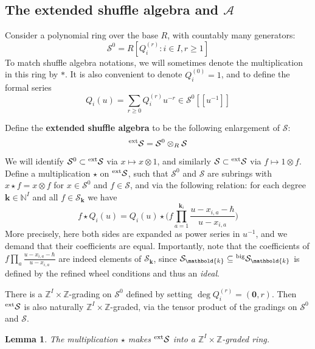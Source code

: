 \documentclass[11pt,reqno]{amsart}
\renewcommand{\mathbf}{\mathbold}
\numberwithin{equation}{section}
\newtheorem{Lemma}[equation]{Lemma}
\theoremstyle{definition}
\newcommand{\cA}{\mathcal{A}}
\newcommand{\cS}{\mathcal{S}}
\newcommand{\bk}{\mathbf{k}}
\newcommand{\NN}{\mathbb{N}}
\newcommand{\ZZ}{\mathbb{Z}}
\newcommand{\leftexp}[2]{\vphantom{#2}^{#1} #2}
\newcommand{\vertexset}{I}
\newcommand{\base}{R}
\newcommand{\qzast}{\cA}
\newcommand{\shu}{\cS}
\newcommand{\preshu}{\leftexp{\mathrm{big}}{\cS}}
\newcommand{\extshu}{\leftexp{\mathrm{ext}}{\cS}}
\newcommand{\shuzero}{\cS^0}
\newcommand{\Qvar}{Q}
\begin{document}
\subsection{The extended shuffle algebra and $\qzast$}
\label{ssec:extshu}

Consider a polynomial ring over the base $\base$, with countably many generators:
\begin{equation}
    \shuzero = \base[\Qvar_i^{(r)} : i \in \vertexset, r \geq 1]
\end{equation}
To match shuffle algebra notations, we will sometimes denote the multiplication in this ring by $\ast$.  It is also  convenient to denote $Q_i^{(0)} = 1$, and to define the formal series 
\begin{equation}
    \label{eq:Qdef}
    Q_i(u) = \sum_{r \geq 0}{Q_i^{(r)} u^{-r}} \in \shuzero[\![u^{-1}]\!]
\end{equation}


Define the \textbf{extended shuffle algebra} to be the following enlargement of $\shu$:
\begin{equation}
    \extshu = \shuzero \otimes_\base \shu
\end{equation}
We will identify  $\shuzero \subset \extshu$ via $x \mapsto  x\otimes 1$, and similarly $\shu \subset \extshu $ via $f \mapsto 1 \otimes f$. Define a  multiplication $\star$ on $\extshu$, such that $\shuzero$ and $ \shu$ are  subrings with $ x\star f = x \otimes f$ for $x \in \shuzero$ and $f \in \shu$, and via the following relation: for each degree $\bk \in \NN^\vertexset$ and all $f \in \shu_\bk$ we have
\begin{equation}
    \label{eq:actionofQ}
    f \star  \Qvar_i(u) =   \Qvar_i(u)  \star \Big(  f \prod_{a = 1}^{\bk_i} \frac{u-x_{i,a}-\hbar}{u-x_{i,a}} \Big)
\end{equation}
More precisely, here both sides are expanded as  power series in $u^{-1}$, and we demand that their coefficients are equal.   Importantly, note that the coefficients of $f \prod_a \frac{u-x_{i,a}-\hbar}{u-x_{i,a}}$ are indeed elements of $\shu_\bk$, since  $\shu_\bk \subseteq \preshu_\bk$ is defined by the refined wheel conditions and thus an \emph{ideal}.

There is a  $\ZZ^\vertexset\times \ZZ$-grading on $\shuzero$ defined by setting $\deg \Qvar_i^{(r)} = (\mathbf{0}, r)$.  Then $\extshu$ is also naturally $\ZZ^\vertexset\times \ZZ$-graded, via the  tensor product of the gradings on $\shuzero$ and $\shu$.
\begin{Lemma}
    The multiplication $\star $ makes $\extshu$ into a $\ZZ^\vertexset\times\ZZ$-graded ring.
\end{Lemma}
\end{document}
